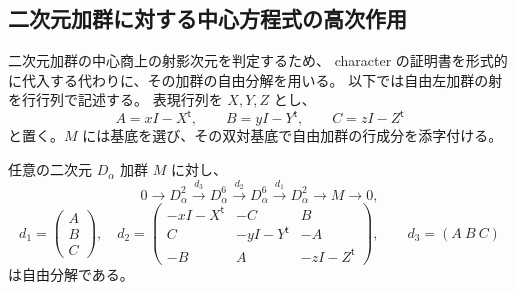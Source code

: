 \subsection{二次元加群に対する中心方程式の高次作用}

二次元加群の中心商上の射影次元を判定するため、
character の証明書を形式的に代入する代わりに、その加群の自由分解を用いる。
以下では自由左加群の射を行行列で記述する。
表現行列を $X,Y,Z$ とし、
\[
 A=xI-X^{\mathsf t},\qquad B=yI-Y^{\mathsf t},\qquad C=zI-Z^{\mathsf t}
\]
と置く。$M$ には基底を選び、その双対基底で自由加群の行成分を添字付ける。

\begin{lemma}[行列係数の長さ三分解と高次作用の抽出]
\label{cmo:lem:two-dimensional-shamash}
任意の二次元 $D_\alpha$ 加群 $M$ に対し、
\begin{equation}\label{cmo:eq:two-dimensional-resolution}
 0\longrightarrow D_\alpha^2\xrightarrow{d_3}D_\alpha^6
 \xrightarrow{d_2}D_\alpha^6\xrightarrow{d_1}D_\alpha^2
 \longrightarrow M\longrightarrow0,
\end{equation}
\[
 d_1=\begin{pmatrix}A\\B\\C\end{pmatrix},\quad
 d_2=\begin{pmatrix}
 -xI-X^{\mathsf t}&-C&B\\
 C&-yI-Y^{\mathsf t}&-A\\
 -B&A&-zI-Z^{\mathsf t}
 \end{pmatrix},\qquad
 d_3=(A\ B\ C)
\]
は自由分解である。


\end{lemma}
